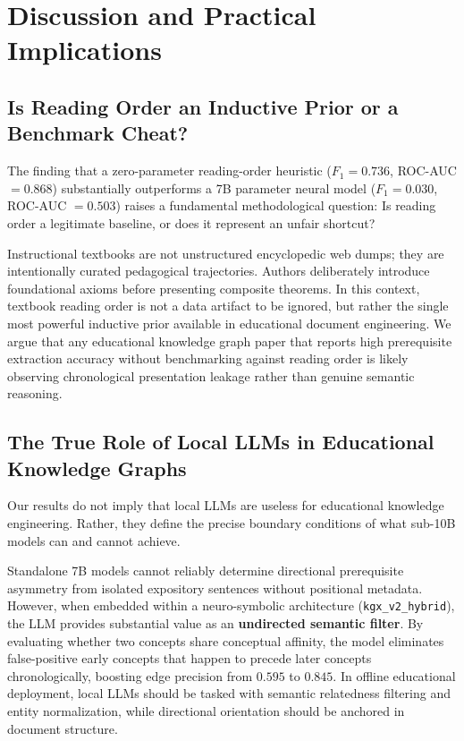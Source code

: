 \section{Discussion and Practical Implications}
\label{sec:discussion}

\subsection{Is Reading Order an Inductive Prior or a Benchmark Cheat?}
The finding that a zero-parameter reading-order heuristic ($F_1 = 0.736$, ROC-AUC $= 0.868$) substantially outperforms a 7B parameter neural model ($F_1 = 0.030$, ROC-AUC $= 0.503$) raises a fundamental methodological question: Is reading order a legitimate baseline, or does it represent an unfair shortcut?

Instructional textbooks are not unstructured encyclopedic web dumps; they are intentionally curated pedagogical trajectories. Authors deliberately introduce foundational axioms before presenting composite theorems. In this context, textbook reading order is not a data artifact to be ignored, but rather the single most powerful inductive prior available in educational document engineering. We argue that any educational knowledge graph paper that reports high prerequisite extraction accuracy without benchmarking against reading order is likely observing chronological presentation leakage rather than genuine semantic reasoning.

\subsection{The True Role of Local LLMs in Educational Knowledge Graphs}
Our results do not imply that local LLMs are useless for educational knowledge engineering. Rather, they define the precise boundary conditions of what sub-10B models can and cannot achieve. 

Standalone 7B models cannot reliably determine directional prerequisite asymmetry from isolated expository sentences without positional metadata. However, when embedded within a neuro-symbolic architecture (\texttt{kgx\_v2\_hybrid}), the LLM provides substantial value as an \textbf{undirected semantic filter}. By evaluating whether two concepts share conceptual affinity, the model eliminates false-positive early concepts that happen to precede later concepts chronologically, boosting edge precision from $0.595$ to $0.845$. In offline educational deployment, local LLMs should be tasked with semantic relatedness filtering and entity normalization, while directional orientation should be anchored in document structure.

